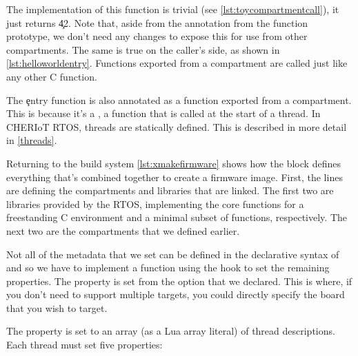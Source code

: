 The implementation of this function is trivial (see \ref{lst:toycompartmentcall}), it just returns \c{42}.
Note that, aside from the annotation from the function prototype, we don't need any changes to expose this for use from other compartments.
The same is true on the caller's side, as shown in \ref{lst:helloworldentry}.
Functions exported from a compartment are called just like any other C function.

\codelisting[filename=examples/hello_world/compartment.cc,marker=all,label=lst:toycompartmentcall,caption="A trivial implementation of an exported function"]{}

\codelisting[filename=examples/hello_world/hello.cc,marker=entry,label=lst:helloworldentry,caption="A simple compartment entry point that does a cross-compartment call"]{}

The \c{entry} function is also annotated as a function exported from a compartment.
This is because it's a , a function that is called at the start of a thread.
In CHERIoT RTOS, threads are statically defined.
This is described in more detail in \ref{threads}.

Returning to the build system \ref{lst:xmakefirmware} shows how the  block defines everything that's combined together to create a firmware image.
First, the  lines are defining the compartments and libraries that are linked.
The first two are libraries provided by the RTOS, implementing the core functions for a freestanding C environment and a minimal subset of  functions, respectively.
The next two are the compartments that we defined earlier.

Not all of the metadata that we set can be defined in the declarative syntax of  and so we have to implement a function using the  hook to set the remaining properties.
The  property is set from the option that we declared.
This is where, if you don't need to support multiple targets, you could directly specify the board that you wish to target.

\lualisting[filename=examples/hello_world/xmake.lua,marker=firmware,label=lst:xmakefirmware,caption="Build system code for linking the final firmware image"]{}

The  property is set to an array (as a Lua array literal) of thread descriptions.
Each thread must set five properties:

